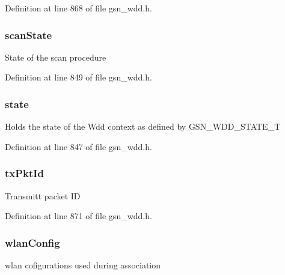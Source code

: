 Definition at line 868 of file gsn\_\-wdd.h.

\hypertarget{a00108_a9851bddc6b7ca4b4cffb8b3babf00448}{
\subsubsection[{scanState}]{ {\bf scanState}}}
\label{a00108_a9851bddc6b7ca4b4cffb8b3babf00448}
State of the scan procedure 

Definition at line 849 of file gsn\_\-wdd.h.

\hypertarget{a00108_a2d16f70cd8cd6b95e83a030f7091c4e2}{
\subsubsection[{state}]{ {\bf state}}}
\label{a00108_a2d16f70cd8cd6b95e83a030f7091c4e2}
Holds the state of the Wdd context as defined by GSN\_\-WDD\_\-STATE\_\-T 

Definition at line 847 of file gsn\_\-wdd.h.

\hypertarget{a00108_affebddbb049ab8a43e825575d648358b}{
\subsubsection[{txPktId}]{ {\bf txPktId}}}
\label{a00108_affebddbb049ab8a43e825575d648358b}
Transmitt packet ID 

Definition at line 871 of file gsn\_\-wdd.h.

\hypertarget{a00108_a003dc28005c9736d062b26e04ed75e68}{
\subsubsection[{wlanConfig}]{ {\bf wlanConfig}}}
\label{a00108_a003dc28005c9736d062b26e04ed75e68}
wlan cofigurations used during association 

